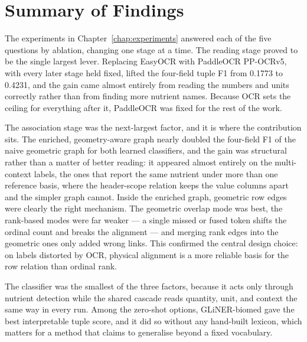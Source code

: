 \section{Summary of Findings}\label{sec:concl-findings}

The experiments in Chapter~\ref{chap:experiments} answered each of the five
questions by ablation, changing one stage at a time. The reading stage proved to
be the single largest lever. Replacing EasyOCR with PaddleOCR PP-OCRv5, with every
later stage held fixed, lifted the four-field tuple F1 from 0.1773 to 0.4231, and
the gain came almost entirely from reading the numbers and units correctly rather
than from finding more nutrient names. Because OCR sets the ceiling for everything
after it, PaddleOCR was fixed for the rest of the work.

The association stage was the next-largest factor, and it is where the
contribution sits. The enriched, geometry-aware graph nearly doubled the
four-field F1 of the naive geometric graph for both learned classifiers, and the
gain was structural rather than a matter of better reading: it appeared almost
entirely on the multi-context labels, the ones that report the same nutrient under
more than one reference basis, where the header-scope relation keeps the value
columns apart and the simpler graph cannot. Inside the enriched graph, geometric
row edges were clearly the right mechanism. The geometric overlap mode was best,
the rank-based modes were far weaker --- a single missed or fused token shifts the
ordinal count and breaks the alignment --- and merging rank edges into the
geometric ones only added wrong links. This confirmed the central design choice:
on labels distorted by OCR, physical alignment is a more reliable basis for the
row relation than ordinal rank.

The classifier was the smallest of the three factors, because it acts only through
nutrient detection while the shared cascade reads quantity, unit, and context the
same way in every run. Among the zero-shot options, GLiNER-biomed gave the best
interpretable tuple score, and it did so without any hand-built lexicon, which
matters for a method that claims to generalise beyond a fixed vocabulary.

